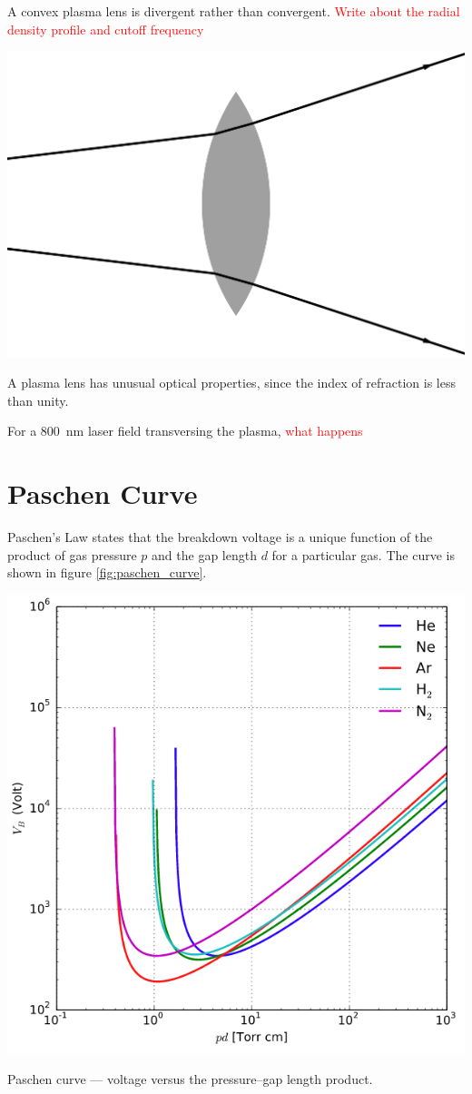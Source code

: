 \documentclass[justified,nofonts,nobib,openany]{tufte-book}
\begin{document}
A convex plasma lens is divergent rather than convergent.
\textcolor{red}{Write about the radial density profile and cutoff frequency}
\begin{marginfigure}
    \includegraphics[width=\marginparwidth]{figures/chen4_30.pdf}
    \caption{A plasma lens has unusual optical properties, since the index of refraction is less than unity.}
    \label{fig:plasma_lens_chen}
\end{marginfigure}
For a \SI{800}{\nm} laser field transversing the plasma, \textcolor{red}{what happens}

\section{Paschen Curve}\label{sec:paschen}
Paschen's Law states that the breakdown voltage is a unique function of the product of gas pressure $p$ and the gap length $d$ for a particular gas. The curve is shown in figure \ref{fig:paschen_curve}.
\begin{marginfigure}
    \includegraphics[width=\marginparwidth]{figures/paschen_curve.PNG}
    \label{fig:paschen_curve}
    \caption{Paschen curve --- voltage versus the pressure--gap length product.}
\end{marginfigure}
\end{document}
